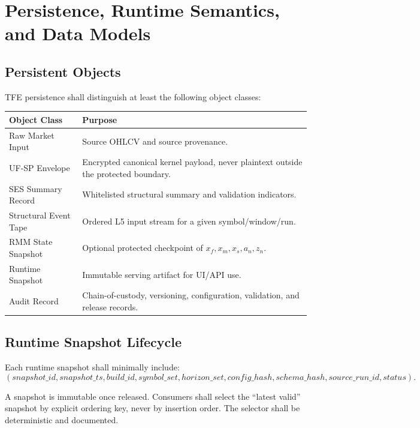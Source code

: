 \chapter{Persistence, Runtime Semantics, and Data Models}
\section{Persistent Objects}

TFE persistence shall distinguish at least the following object classes:
\begin{longtable}{p{}p{}}
\toprule
Object Class & Purpose \\
\midrule
Raw Market Input & Source OHLCV and source provenance. \\
UF-SP Envelope & Encrypted canonical kernel payload, never plaintext outside the protected boundary. \\
SES Summary Record & Whitelisted structural summary and validation indicators. \\
Structural Event Tape & Ordered L5 input stream for a given symbol/window/run. \\
RMM State Snapshot & Optional protected checkpoint of $x_f,x_m,x_s,a_n,z_n$. \\
Runtime Snapshot & Immutable serving artifact for UI/API use. \\
Audit Record & Chain-of-custody, versioning, configuration, validation, and release records. \\
\bottomrule
\end{longtable}

\section{Runtime Snapshot Lifecycle}

Each runtime snapshot shall minimally include:
\[
(snapshot\_id, snapshot\_ts, build\_id, symbol\_set, horizon\_set, config\_hash, schema\_hash, source\_run\_id, status).
\]

A snapshot is immutable once released. Consumers shall select the ``latest valid'' snapshot by explicit ordering key, never by insertion order. The selector shall be deterministic and documented.


